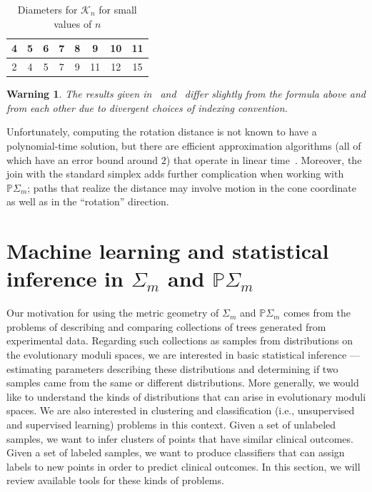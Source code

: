 \documentclass[a4paper,11pt]{article}
\newtheorem{warning}[theorem]{Warning}
\newcommand{\aK}{\mathcal{K}}
\begin{document}
\begin{table}[ht]
    \caption{Diameters for $\aK_n$ for small values of $n$}
    \centering
    \begin{tabular}{c c c c c c c c}
    \hline\hline
    4 & 5 & 6 & 7 & 8 & 9 & 10 & 11 \\
    \hline
    2 & 4 & 5 & 7 & 9 & 11 & 12 & 15 \\
    \hline
    \end{tabular}
\end{table}

\begin{warning}
The results given in~\cite{pournin2014diameter} and~\cite{sleator1988rotation} differ slightly from the formula above and from each other due to divergent choices of indexing convention.
\end{warning}

Unfortunately, computing the rotation distance is not known to have a polynomial-time solution, but there are efficient approximation algorithms (all of which have an error bound around $2$) that operate in linear time~\cite{cleary2010linear}.
Moreover, the join with the standard simplex adds further complication when working with $\mathbb{P}\Sigma_m$; paths that realize the distance may involve motion in the cone coordinate as well as in the ``rotation'' direction.


\section{Machine learning and statistical inference in $\Sigma_m$ and $\mathbb{P}\Sigma_m$}\label{sec:ML}

Our motivation for using the metric geometry of $\Sigma_m$ and $\mathbb{P}\Sigma_m$ comes from the problems of describing and comparing collections of trees generated from experimental data.
Regarding such collections as samples from distributions on the evolutionary moduli spaces, we are interested in basic statistical inference --- estimating parameters describing these distributions and determining if two samples came from the same or different distributions.
More generally, we would like to understand the kinds of distributions that can arise in evolutionary moduli spaces.
We are also interested in clustering and classification (i.e., unsupervised and supervised learning) problems in this context.
Given a set of unlabeled samples, we want to infer clusters of points that have similar clinical outcomes.
Given a set of labeled samples, we want to produce classifiers that can assign labels to new points in order to predict clinical outcomes.
In this section, we will review available tools for these kinds of problems.
\end{document}
